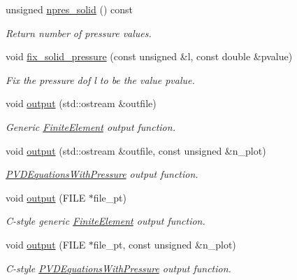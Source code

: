 \begin{DoxyCompactItemize}
unsigned \hyperlink{classoomph_1_1TPVDElementWithContinuousPressure_a3d468e3b84be5dee1ff2d556b82e9554}{npres\+\_\+solid} () const
\begin{DoxyCompactList}\small\item\em Return number of pressure values. \end{DoxyCompactList}\item 
void \hyperlink{classoomph_1_1TPVDElementWithContinuousPressure_a6f45a094fc941c13ad8e0fc448eea782}{fix\+\_\+solid\+\_\+pressure} (const unsigned \&l, const double \&pvalue)
\begin{DoxyCompactList}\small\item\em Fix the pressure dof l to be the value pvalue. \end{DoxyCompactList}\item 
void \hyperlink{classoomph_1_1TPVDElementWithContinuousPressure_a33bc9dab61e60a0de1cb784020c5f056}{output} (std\+::ostream \&outfile)
\begin{DoxyCompactList}\small\item\em Generic \hyperlink{classoomph_1_1FiniteElement}{Finite\+Element} output function. \end{DoxyCompactList}\item 
void \hyperlink{classoomph_1_1TPVDElementWithContinuousPressure_aefeba130e3533f5af5286830d271028d}{output} (std\+::ostream \&outfile, const unsigned \&n\+\_\+plot)
\begin{DoxyCompactList}\small\item\em \hyperlink{classoomph_1_1PVDEquationsWithPressure}{P\+V\+D\+Equations\+With\+Pressure} output function. \end{DoxyCompactList}\item 
void \hyperlink{classoomph_1_1TPVDElementWithContinuousPressure_a082f3c2e891783a923daeaee5686203c}{output} (F\+I\+LE $\ast$file\+\_\+pt)
\begin{DoxyCompactList}\small\item\em C-\/style generic \hyperlink{classoomph_1_1FiniteElement}{Finite\+Element} output function. \end{DoxyCompactList}\item 
void \hyperlink{classoomph_1_1TPVDElementWithContinuousPressure_a943ae7f4fcad3538108a207325160c92}{output} (F\+I\+LE $\ast$file\+\_\+pt, const unsigned \&n\+\_\+plot)
\begin{DoxyCompactList}\small\item\em C-\/style \hyperlink{classoomph_1_1PVDEquationsWithPressure}{P\+V\+D\+Equations\+With\+Pressure} output function. \end{DoxyCompactList}\item 

\end{DoxyCompactItemize}
